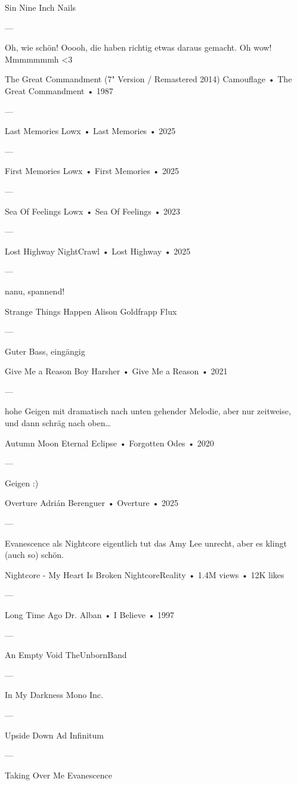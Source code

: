 Sin
Nine Inch Nails

—

Oh, wie schön! Ooooh, die haben richtig etwas daraus gemacht. Oh wow!
Mmmmmmmh <3

The Great Commandment (7" Version / Remastered 2014)
Camouflage
 •
The Great Commandment
 •
1987


—

Last Memories
Lowx
 •
Last Memories
 • 2025

—

First Memories
Lowx
 •
First Memories
 • 2025

—

Sea Of Feelings
Lowx
 •
Sea Of Feelings
 • 2023

—

Lost Highway
NightCrawl
 •
Lost Highway
 • 2025

—

nanu, spannend!

Strange Things Happen
Alison Goldfrapp
Flux

—

Guter Bass, eingängig

Give Me a Reason
Boy Harsher
 •
Give Me a Reason
 • 2021

—

hohe Geigen mit dramatisch nach unten gehender Melodie, aber nur zeitweise, und dann schräg nach oben…

Autumn Moon
Eternal Eclipse
 •
Forgotten Odes
 •
2020

—

Geigen :)

Overture
Adrián Berenguer
 •
Overture
 •
2025


—

Evanescence als Nightcore
eigentlich tut das Amy Lee unrecht, aber es klingt (auch so) schön.

Nightcore - My Heart Is Broken
NightcoreReality
 •
1.4M views
 •
12K likes

—

Long Time Ago
Dr. Alban
 •
I Believe
 •
1997


—

An Empty Void
TheUnbornBand

—

In My Darkness
Mono Inc.

—

Upside Down
Ad Infinitum

—

Taking Over Me
Evanescence

